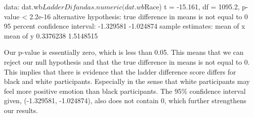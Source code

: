 \documentclass{article}
\begin{document}
\begin{enumerate}
\begin{Schunk}
\begin{Soutput}
data:  dat.wb$LadderDif and as.numeric(dat.wb$Race)
t = -15.161, df = 1095.2, p-value < 2.2e-16
alternative hypothesis: true difference in means is not equal to 0
95 percent confidence interval:
 -1.329581 -1.024874
sample estimates:
mean of x mean of y 
0.3376238 1.5148515 
\end{Soutput}
\end{Schunk}
Our p-value is essentially zero, which is less than 0.05. This means that we can reject our null hypothesis and that the true difference in means is not equal to 0. This implies that there is evidence that the ladder difference score differs for black and white participants. Especially in the sense that white participants may feel more positive emotion than black participants. The 95\% confidence interval given, (-1.329581, -1.024874), also does not contain 0, which further strengthens our results. 


\end{enumerate}
\end{document}
